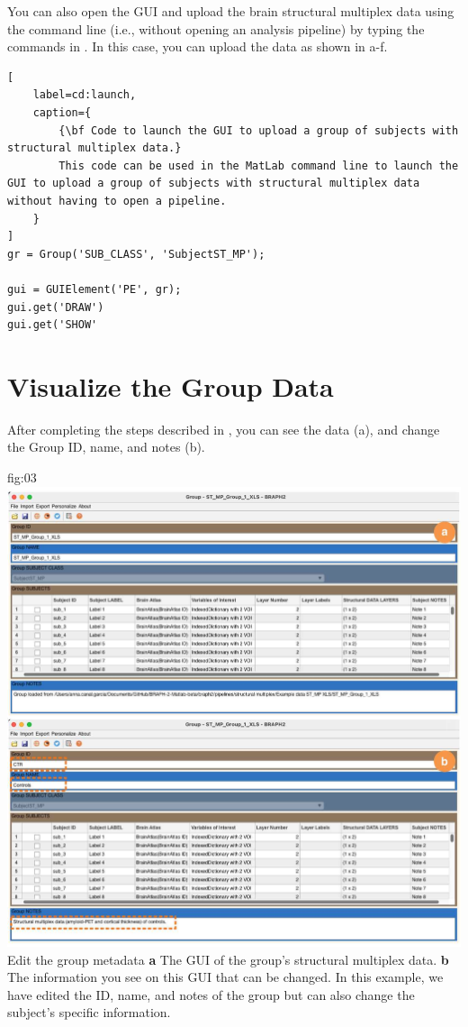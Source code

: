 \documentclass[justified]{tufte-handout}
\begin{document}

\begin{tcolorbox}[
	title=GUI launch from command line
]
You can also open the GUI and upload the brain structural multiplex data using the command line (i.e., without opening an analysis pipeline) by typing the commands in . In this case, you can upload the data as shown in a-f.
%
\begin{lstlisting}[
	label=cd:launch,
	caption={
		{\bf Code to launch the GUI to upload a group of subjects with structural multiplex data.}
		This code can be used in the MatLab command line to launch the GUI to upload a group of subjects with structural multiplex data without having to open a pipeline.
	}
]
gr = Group('SUB_CLASS', 'SubjectST_MP');

gui = GUIElement('PE', gr);
gui.get('DRAW')
gui.get('SHOW'
\end{lstlisting}
\end{tcolorbox}

\section{Visualize the Group Data}

After completing the steps described in , you can see the data (a), and change the Group ID, name, and notes (b). 

	{fig:03}
	{
	\includegraphics{fig03.jpg}
	}
	{Edit the group metadata}
	{ 
	{\bf a} The GUI of the group's structural multiplex data. 
	{\bf b} The information you see on this GUI that can be changed. In this example, we have edited the ID, name, and notes of the group but can also change the subject's specific information.
	}
\end{document}
